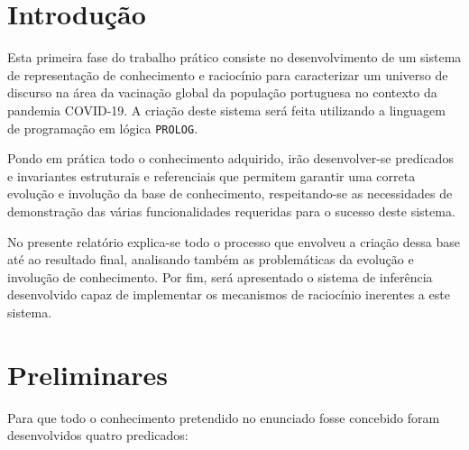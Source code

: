\documentclass[a4paper, 11pt]{article}
\begin{document}
\pagebreak

\tableofcontents

\pagebreak

\lstlistoflistings

\listoffigures

\pagebreak


\pagestyle{fancy}
\fancyhf{}


\renewcommand{\headrulewidth}{0pt}

\section{Introdução}

Esta primeira fase do trabalho prático consiste no desenvolvimento de um sistema de representação de conhecimento e
raciocínio para caracterizar um universo de discurso na área da vacinação global da população portuguesa no contexto da
pandemia COVID-19. A criação deste sistema será feita utilizando a linguagem de programação em lógica \texttt{PROLOG}. 

Pondo em prática todo o conhecimento adquirido, irão desenvolver-se predicados e invariantes estruturais e referenciais
que permitem garantir uma correta evolução e involução da base de conhecimento, respeitando-se as necessidades de demonstração
das várias funcionalidades requeridas para o sucesso deste sistema.

No presente relatório explica-se todo o processo que envolveu a criação dessa base até ao resultado final, analisando
também as problemáticas da evolução e involução de conhecimento. Por fim, será apresentado o sistema de inferência
desenvolvido capaz de implementar os mecanismos de raciocínio inerentes a este sistema.

\pagebreak

\section{Preliminares}

Para que todo o conhecimento pretendido no enunciado fosse concebido foram desenvolvidos quatro predicados:
\end{document}
